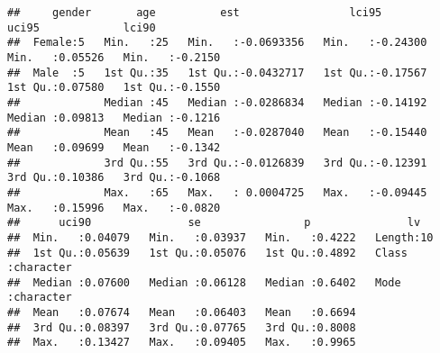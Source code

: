 \documentclass[
]{article}
\begin{document}
\begin{verbatim}
##     gender       age          est                 lci95              uci95             lci90        
##  Female:5   Min.   :25   Min.   :-0.0693356   Min.   :-0.24300   Min.   :0.05526   Min.   :-0.2150  
##  Male  :5   1st Qu.:35   1st Qu.:-0.0432717   1st Qu.:-0.17567   1st Qu.:0.07580   1st Qu.:-0.1550  
##             Median :45   Median :-0.0286834   Median :-0.14192   Median :0.09813   Median :-0.1216  
##             Mean   :45   Mean   :-0.0287040   Mean   :-0.15440   Mean   :0.09699   Mean   :-0.1342  
##             3rd Qu.:55   3rd Qu.:-0.0126839   3rd Qu.:-0.12391   3rd Qu.:0.10386   3rd Qu.:-0.1068  
##             Max.   :65   Max.   : 0.0004725   Max.   :-0.09445   Max.   :0.15996   Max.   :-0.0820  
##      uci90               se                p               lv           
##  Min.   :0.04079   Min.   :0.03937   Min.   :0.4222   Length:10         
##  1st Qu.:0.05639   1st Qu.:0.05076   1st Qu.:0.4892   Class :character  
##  Median :0.07600   Median :0.06128   Median :0.6402   Mode  :character  
##  Mean   :0.07674   Mean   :0.06403   Mean   :0.6694                     
##  3rd Qu.:0.08397   3rd Qu.:0.07765   3rd Qu.:0.8008                     
##  Max.   :0.13427   Max.   :0.09405   Max.   :0.9965
\end{verbatim}
\end{document}
